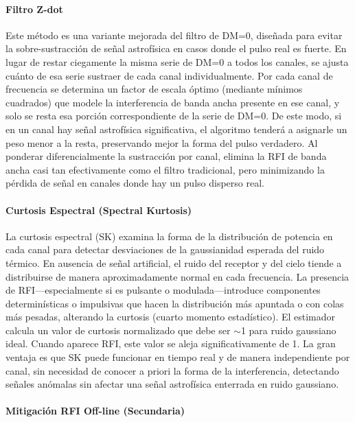 \paragraph{Filtro Z-dot}

Este método es una variante mejorada del filtro de DM=0, diseñada para evitar la sobre-sustracción de señal astrofísica en casos donde el pulso real es fuerte. En lugar de restar ciegamente la misma serie de DM=0 a todos los canales, se ajusta cuánto de esa serie sustraer de cada canal individualmente. Por cada canal de frecuencia se determina un factor de escala óptimo (mediante mínimos cuadrados) que modele la interferencia de banda ancha presente en ese canal, y solo se resta esa porción correspondiente de la serie de DM=0. De este modo, si en un canal hay señal astrofísica significativa, el algoritmo tenderá a asignarle un peso menor a la resta, preservando mejor la forma del pulso verdadero. Al ponderar diferencialmente la sustracción por canal, elimina la RFI de banda ancha casi tan efectivamente como el filtro tradicional, pero minimizando la pérdida de señal en canales donde hay un pulso disperso real.

\paragraph{Curtosis Espectral (Spectral Kurtosis)}

La curtosis espectral (SK) examina la forma de la distribución de potencia en cada canal para detectar desviaciones de la gaussianidad esperada del ruido térmico. En ausencia de señal artificial, el ruido del receptor y del cielo tiende a distribuirse de manera aproximadamente normal en cada frecuencia. La presencia de RFI—especialmente si es pulsante o modulada—introduce componentes determinísticas o impulsivas que hacen la distribución más apuntada o con colas más pesadas, alterando la curtosis (cuarto momento estadístico). El estimador calcula un valor de curtosis normalizado que debe ser $\sim$1 para ruido gaussiano ideal. Cuando aparece RFI, este valor se aleja significativamente de 1. La gran ventaja es que SK puede funcionar en tiempo real y de manera independiente por canal, sin necesidad de conocer a priori la forma de la interferencia, detectando señales anómalas sin afectar una señal astrofísica enterrada en ruido gaussiano.

\paragraph{Mitigación RFI Off-line (Secundaria)}

